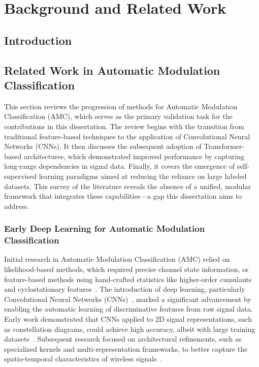 %
%

\chapter{Background and Related Work}
\label{chap:background}

\section{Introduction}

\section{Related Work in Automatic Modulation Classification}
\label{sec:related_work}

This section reviews the progression of methods for Automatic Modulation Classification (AMC), which serves as the primary validation task for the contributions in this dissertation. The review begins with the transition from traditional feature-based techniques to the application of Convolutional Neural Networks (CNNs). It then discusses the subsequent adoption of Transformer-based architectures, which demonstrated improved performance by capturing long-range dependencies in signal data. Finally, it covers the emergence of self-supervised learning paradigms aimed at reducing the reliance on large labeled datasets. This survey of the literature reveals the absence of a unified, modular framework that integrates these capabilities—a gap this dissertation aims to address.

\subsection{Early Deep Learning for Automatic Modulation Classification}

Initial research in Automatic Modulation Classification (AMC) relied on likelihood-based methods, which required precise channel state information, or feature-based methods using hand-crafted statistics like higher-order cumulants and cyclostationary features~\cite{swami2000hierarchical,gardner1994cyclostationarity,nandi1995automatic}. The introduction of deep learning, particularly Convolutional Neural Networks (CNNs)~\cite{o2016convolutional,peng2017modulation}, marked a significant advancement by enabling the automatic learning of discriminative features from raw signal data. Early work demonstrated that CNNs applied to 2D signal representations, such as constellation diagrams, could achieve high accuracy, albeit with large training datasets~\cite{peng2018modulation}. Subsequent research focused on architectural refinements, such as specialized kernels and multi-representation frameworks, to better capture the spatio-temporal characteristics of wireless signals~\cite{huynh2020mcnet}.

